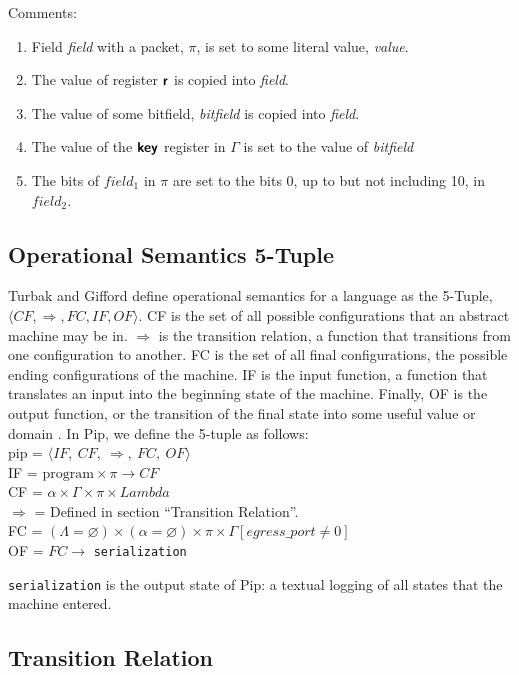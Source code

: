 Comments:
\begin{enumerate}
\item Field \textit{field} with a packet, $\pi$, is set to some literal value, \textit{value}.
\item The value of register $\bm{\mathsf{{r}}}$ is copied into \textit{field}.
\item The value of some bitfield, \textit{bitfield} is copied into \textit{field}.
\item The value of the $\bm{\mathsf{{key}}}$ register in $\Gamma$ is set to the value of \textit{bitfield}
\item The bits of $field_1$ in $\pi$ are set to the bits 0, up to but not including 10, in $field_2$.
\end{enumerate}


\subsection{Operational Semantics 5-Tuple}
Turbak and Gifford define operational semantics for a language as the 5-Tuple, $\langle CF, \Rightarrow, FC, IF, OF \rangle$. CF is the set of all possible configurations that an abstract machine may be in. $\Rightarrow$ is the transition relation, a function that transitions from one configuration to another. FC is the set of all final configurations, the possible ending configurations of the machine. IF is the input function, a function that translates an input into the beginning state of the machine. Finally, OF is the output function, or the transition of the final state into some useful value or domain \cite{Turbak2008}. In Pip, we define the 5-tuple as follows:\\
pip = $\langle IF, \ CF, \ \Rightarrow, \ FC, \ OF \rangle$\\
IF = $\textrm{program} \times \pi \rightarrow CF$ \\
CF = $\alpha \times \Gamma \times \pi \times Lambda$ \\
$\Rightarrow$ = Defined in section ``Transition Relation''. \\
FC = $(\Lambda = \varnothing) \times (\alpha = \varnothing) \times \pi \times \Gamma[egress\_port \neq 0]$ \\
OF = $FC \rightarrow$ \texttt{serialization}

\texttt{serialization} is the output state of Pip: a textual logging of all states that the machine entered.
\subsection{Transition Relation}
\setlength{\mathindent}{0pt}

